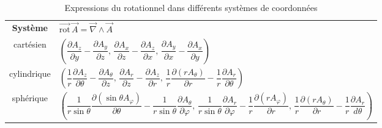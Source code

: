 \begin{table*}
\centering
\footnotesize
\begin{tabular}{c|l}
\toprule
\textbf{Système} & $\overrightarrow{\text{rot}}\,\overrightarrow{A}=\overrightarrow{\nabla}\wedge\overrightarrow{A}$ \\
cartésien & $\left(\dfrac{\partial A_{z}}{\partial y}-\dfrac{\partial A_{y}}{\partial z},\,
\dfrac{\partial A_{x}}{\partial z}-\dfrac{\partial A_{z}}{\partial x},\,
\dfrac{\partial A_{y}}{\partial x}-\dfrac{\partial A_{x}}{\partial y}\right)$\\[4mm]
cylindrique & $\left(\dfrac{1}{r}\dfrac{\partial A_{z}}{\partial\theta}-\dfrac{\partial A_{\theta}}{\partial z},\,
\dfrac{\partial A_{r}}{\partial z}-\dfrac{\partial A_{z}}{\partial r},\,
\dfrac{1}{r}\dfrac{\partial(rA_{\theta})}{\partial r}-\dfrac{1}{r}\dfrac{\partial A_{r}}{\partial \theta}\right)$\\[4mm]
sphérique & $\left(\dfrac{1}{r\sin\theta}\dfrac{\partial(\sin\theta A_{\varphi})}{\partial\theta} - \dfrac{1}{r\sin\theta}\dfrac{\partial A_{\theta}}{\partial\varphi},\,
\dfrac{1}{r\sin\theta}\dfrac{\partial A_{r}}{\partial\varphi}-\dfrac{1}{r}\dfrac{\partial(rA_{\varphi})}{\partial r},\, \dfrac{1}{r}\dfrac{\partial(rA_{\theta})}{\partial r}-\dfrac{1}{r}\dfrac{\partial A_{r}}{d\theta}\right)$\\[4mm]
	\bottomrule
	\end{tabular}	
\caption{Expressions du rotationnel dans différents systèmes de coordonnées}
\end{table*}

